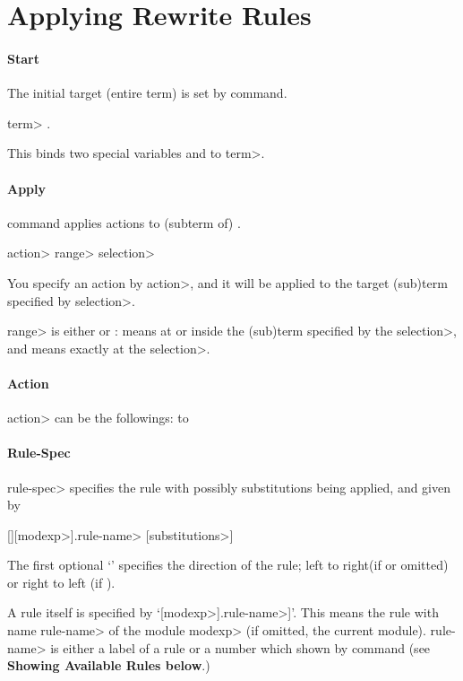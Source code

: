 \documentclass[a4paper,oneside,twocolumn]{memoir}
\begin{document}
\section{Applying Rewrite Rules}

\paragraph{Start}
The initial target (entire term) is set by  command.

 \<term> .

This binds two special variables  and
 to \<term>. 

\paragraph{Apply}
 command applies actions to (subterm of) .

 \<action> \<range> \<selection>

You specify an action by \<action>, and it will be applied to the
target (sub)term specified by \<selection>. 

\<range> is either  or :  means at or
inside the  (sub)term specified by the \<selection>, and 
means exactly at the \<selection>.

\paragraph{Action}
\<action> can be the followings:
\paralign to 

\paragraph{Rule-Spec}
\<rule-spec> specifies the rule with possibly substitutions being
applied, and given by 

[\kbd{+ | -}][\<modexp>].\<rule-name> [\<substitutions>]

The first optional `\kbd{+ | -}' specifies the direction of the rule; 
left to right(if \kbd{+} or omitted) or right to left (if \kbd{-}).

A rule itself is specified by `[\<modexp>].\<rule-name>]'. This means
the rule with name \<rule-name> of the module \<modexp> (if omitted, the
current module). \<rule-name> is either a label of a rule or a number 
which shown by  command (see {\bf Showing Available
  Rules below}.) 
\end{document}
